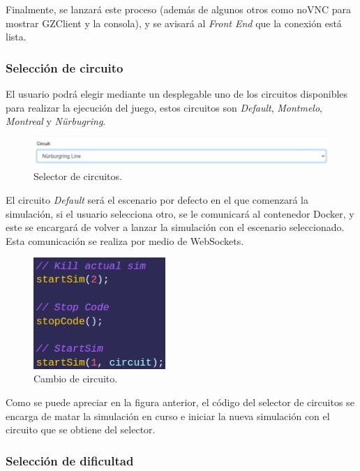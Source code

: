 \documentclass[a4paper, 12pt]{book}
\begin{document}
Finalmente, se lanzará este proceso (además de algunos otros como noVNC para mostrar GZClient y la consola), y se avisará al \emph{Front End} que la conexión está lista.

\subsubsection{Selección de circuito}
\label{subsec:follow_line_game_circuito}

El usuario podrá elegir mediante un desplegable uno de los circuitos disponibles para realizar la ejecución del juego, estos circuitos son \emph{Default}, \emph{Montmelo}, \emph{Montreal} y \emph{Nürbugring}. 

\begin{figure}[H]
	\centering
    \includegraphics[width=15cm]{img/circuit_selector.png}
    \caption{Selector de circuitos.}
    \label{figura:circuit_selector}
\end{figure}

El circuito \emph{Default} será el escenario por defecto en el que comenzará la simulación, si el usuario selecciona otro, se le comunicará al contenedor Docker, y este se encargará de volver a lanzar la simulación con el escenario seleccionado. Esta comunicación se realiza por medio de WebSockets.

\begin{figure}[H]
	\centering
    \includegraphics[width=5cm]{img/select_circuit_code.png}
    \caption{Cambio de circuito.}
    \label{figura:circuit_selector}
\end{figure}

Como se puede apreciar en la figura anterior, el código del selector de circuitos se encarga de matar la simulación en curso e iniciar la nueva simulación con el circuito que se obtiene del selector.

\subsubsection{Selección de dificultad}
\label{subsec:follow_line_game_circuito}
\end{document}
